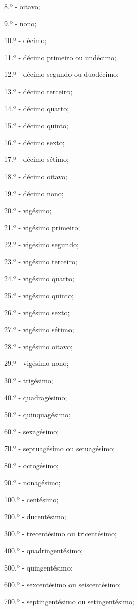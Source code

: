 \begin{multicols*}{2}
\begin{enumerate}
		      8.º - oitavo;

		      9.º - nono;

		      10.º - décimo;

		      11.º - décimo primeiro ou undécimo;

		      12.º - décimo segundo ou duodécimo;

		      13.º - décimo terceiro;

		      14.º - décimo quarto;

		      15.º - décimo quinto;

		      16.º - décimo sexto;

		      17.º - décimo sétimo;

		      18.º - décimo oitavo;

		      19.º - décimo nono;

		      20.º - vigésimo;

		      21.º - vigésimo primeiro;

		      22.º - vigésimo segundo;

		      23.º - vigésimo terceiro;

		      24.º - vigésimo quarto;

		      25.º - vigésimo quinto;

		      26.º - vigésimo sexto;

		      27.º - vigésimo sétimo;

		      28.º - vigésimo oitavo;

		      29.º - vigésimo nono;

		      30.º - trigésimo;

		      40.º - quadragésimo;

		      50.º - quinquagésimo;

		      60.º - sexagésimo;

		      70.º - septuagésimo ou setuagésimo;

		      80.º - octogésimo;

		      90.º - nonagésimo;

		      100.º - centésimo;

		      200.º - ducentésimo;

		      300.º - trecentésimo ou tricentésimo;

		      400.º - quadringentésimo;

		      500.º - quingentésimo;

		      600.º - sexcentésimo ou seiscentésimo;

		      700.º - septingentésimo ou setingentésimo;


\end{enumerate}
\end{multicols*}
